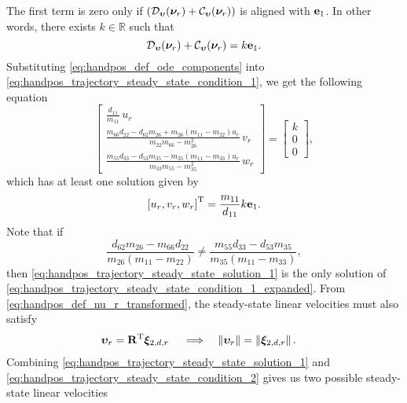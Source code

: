 The first term is zero only if $\left(\mathcal{D}_{\bm{\upsilon}}(\bm{\nu}_r) + \mathcal{C}_{\bm{\upsilon}}(\bm{\nu}_r)\right)$ is aligned with $\mathbf{e}_1$.
In other words, there exists $k \in \mathbb{R}$ such that
\begin{equation}
    \mathcal{D}_{\bm{\upsilon}}(\bm{\nu}_r) + \mathcal{C}_{\bm{\upsilon}}(\bm{\nu}_r) = k \mathbf{e}_1. \label{eq:handpos_trajectory_steady_state_condition_1}
\end{equation}
Substituting \eqref{eq:handpos_def_ode_components} into \eqref{eq:handpos_trajectory_steady_state_condition_1}, we get the following equation
\begin{equation}
    \begin{bmatrix}
        \frac{d_{11}}{m_{11}}\,u_r \\
        \frac{m_{66}d_{22} - d_{62}m_{26} + m_{26}\left(m_{11} - m_{22}\right)u_r}{m_{22}m_{66} - m_{26}^2}\,v_r \\
        \frac{m_{55}d_{33} - d_{53}m_{35} - m_{35}\left(m_{11} - m_{33}\right)u_r}{m_{33}m_{55} - m_{35}^2}\,w_r
    \end{bmatrix}
     = \begin{bmatrix}
        k \\ 0 \\ 0
     \end{bmatrix}, \label{eq:handpos_trajectory_steady_state_condition_1_expanded}
\end{equation}
which has at least one solution given by
\begin{equation}
    \left[u_r, v_r, w_r\right]^{\mathrm{T}} = \frac{m_{11}}{d_{11}} k \mathbf{e}_1. \label{eq:handpos_trajectory_steady_state_solution_1}
\end{equation}
Note that if
\begin{equation}
    \frac{d_{62}m_{26} - m_{66}d_{22}}{m_{26}\left(m_{11} - m_{22}\right)}
    \neq
    \frac{m_{55}d_{33} - d_{53}m_{35}}{m_{35}\left(m_{11} - m_{33}\right)},
    \label{eq:handpos_trajectory_inequality}
\end{equation}
then \eqref{eq:handpos_trajectory_steady_state_solution_1} is the only solution of \eqref{eq:handpos_trajectory_steady_state_condition_1_expanded}.
From \eqref{eq:handpos_def_nu_r_transformed}, the steady-state linear velocities must also satisfy
\begin{align}
    \bm{\upsilon}_r &= \mathbf{R}^{\mathrm{T}} \bm{\xi}_{2, d, r}& &\implies& \left\|\bm{\upsilon}_r\right\| &= \left\|\bm{\xi}_{2, d, r}\right\|. \label{eq:handpos_trajectory_steady_state_condition_2}
\end{align}
Combining \eqref{eq:handpos_trajectory_steady_state_solution_1} and \eqref{eq:handpos_trajectory_steady_state_condition_2} gives us two possible steady-state linear velocities
